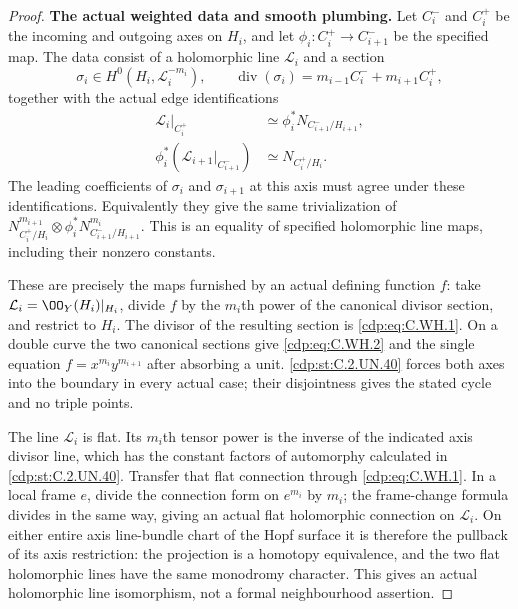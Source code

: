 \begin{proof}
\par\medskip\noindent\textbf{The actual weighted data and smooth plumbing.}
Let $C_i^-$ and $C_i^+$ be the incoming and
outgoing axes on $H_i$, and let
$\phi_i:C_i^+\to C_{i+1}^-$ be the specified map.
The data consist of a holomorphic line
$\mathcal L_i$ and a section
\[
 \sigma_i\in H^0(H_i,\mathcal L_i^{-m_i}),
 \qquad
 \operatorname{div}(\sigma_i)=
       m_{i-1}C_i^-+m_{i+1}C_i^+,
\tag{C.WH.1}\label{cdp:eq:C.WH.1}
\]
together with the actual edge identifications
\[
 \begin{aligned}
 \mathcal L_i|_{C_i^+}
   &\simeq \phi_i^*N_{C_{i+1}^-/H_{i+1}},\\
 \phi_i^*(\mathcal L_{i+1}|_{C_{i+1}^-})
   &\simeq N_{C_i^+/H_i}.
 \end{aligned}
\tag{C.WH.2}\label{cdp:eq:C.WH.2}
\]
The leading coefficients of $\sigma_i$ and
$\sigma_{i+1}$ at this axis must agree under
these identifications. Equivalently they
give the same trivialization of
$N_{C_i^+/H_i}^{m_{i+1}}\otimes
 \phi_i^*N_{C_{i+1}^-/H_{i+1}}^{m_i}$.
This is an equality of specified holomorphic
line maps, including their nonzero constants.

These are precisely the maps furnished by
an actual defining function $f$:
take $\mathcal L_i=\OO_Y(H_i)|_{H_i}$,
divide $f$ by the $m_i$th power of the
canonical divisor section, and restrict
to $H_i$. The divisor of the resulting
section is \eqref{cdp:eq:C.WH.1}. On a double curve
the two canonical sections give \eqref{cdp:eq:C.WH.2}
and the single equation $f=x^{m_i}y^{m_{i+1}}$
after absorbing a unit. \ref{cdp:st:C.2.UN.40} forces
both axes into the boundary in every
actual case; their disjointness gives
the stated cycle and no triple points.

The line $\mathcal L_i$ is flat. Its
$m_i$th tensor power is the inverse of
the indicated axis divisor line, which
has the constant factors of automorphy
calculated in \ref{cdp:st:C.2.UN.40}. Transfer that flat
connection through \eqref{cdp:eq:C.WH.1}. In a local
frame $e$, divide the connection form
on $e^{m_i}$ by $m_i$; the frame-change
formula divides in the same way, giving
an actual flat holomorphic connection
on $\mathcal L_i$.
On either entire axis line-bundle chart
of the Hopf surface it is therefore the
pullback of its axis restriction:
the projection is a homotopy equivalence,
and the two flat holomorphic lines have
the same monodromy character. This gives
an actual holomorphic line isomorphism,
not a formal neighbourhood assertion.


\end{proof}
